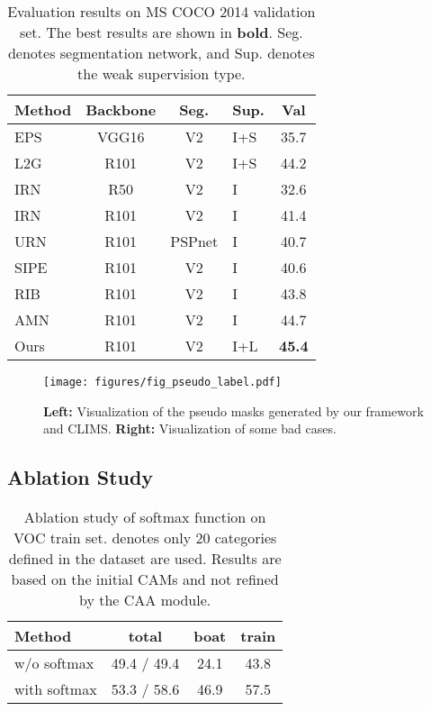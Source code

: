 \documentclass[10pt,twocolumn,letterpaper]{article}
\begin{document}
\begin{table}
  \centering
  \begin{tabular}{lcclc}
    \toprule
    Method  & Backbone   & Seg.    & Sup.    & Val \\
    \midrule
EPS~\cite{Lee2021EPS}       & VGG16      & V2    & I+S  & 35.7 \\
    L2G~\cite{jiang2022l2g}       & R101       & V2    & I+S  & 44.2 \\
    IRN~\cite{Ahn2019IRN}       & R50        & V2    & I    & 32.6 \\
    IRN~\cite{Ahn2019IRN}       & R101       & V2    & I    & 41.4 \\
    URN~\cite{Li2022URN}       & R101       & PSPnet & I    & 40.7 \\
    SIPE~\cite{Chen_2022_CVPR_SIPE}      & R101       & V2    & I    & 40.6 \\
    RIB~\cite{Lee2021ReducingIB}       & R101       & V2    & I    & 43.8 \\
    AMN~\cite{Lee2022AMN}       & R101       & V2    & I    & 44.7 \\
    Ours       & R101       & V2    & I+L    & \textbf{45.4} \\
    \bottomrule
  \end{tabular}
  \caption{Evaluation results on MS COCO 2014 validation set. The best results are shown in \textbf{bold}. Seg. denotes segmentation network, and Sup. denotes the weak supervision type.}
  \label{tab:segmentation performance COCO}
  \vspace{-2mm}
\end{table}



\begin{figure*}[t]
  \centering
\texttt{[image: figures/fig\_pseudo\_label.pdf]}

   \caption{\textbf{Left:} Visualization of the pseudo masks generated by our framework and CLIMS. \textbf{Right:} Visualization of some bad cases.
   }
\label{fig:vis_pseudo_label}
\end{figure*}

\subsection{Ablation Study}

\begin{table}
  \centering
  \begin{tabular}{lccc}
    \toprule
    Method  & total & boat & train \\
    \midrule
    w/o softmax  & 49.4 / 49.4 & 24.1 & 43.8 \\
    with softmax & 53.3 / 58.6 & 46.9 & 57.5 \\
    \bottomrule
  \end{tabular}
  \caption{Ablation study of softmax function on VOC train set.  denotes only 20 categories defined in the dataset are used. Results are based on the initial CAMs and not refined by the CAA module.}
  \vspace{-4mm}
  \label{tab:softmax ablation}
\end{table}
\end{document}
